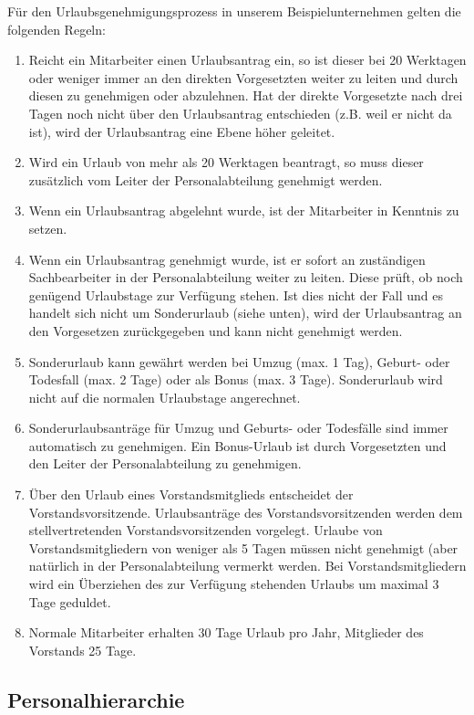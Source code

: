 Für den Urlaubsgenehmigungsprozess in unserem Beispielunternehmen gelten die folgenden Regeln:
\begin{enumerate}
	\item Reicht ein Mitarbeiter einen Urlaubsantrag ein, so ist dieser bei 20 Werktagen oder weniger
	immer an den direkten Vorgesetzten weiter zu leiten und durch diesen zu genehmigen oder
	abzulehnen. Hat der direkte Vorgesetzte nach drei Tagen noch nicht über den Urlaubsantrag
	entschieden (z.B. weil er nicht da ist), wird der Urlaubsantrag eine Ebene höher geleitet.
	\item Wird ein Urlaub von mehr als 20 Werktagen beantragt, so muss dieser zusätzlich vom Leiter der
	Personalabteilung genehmigt werden.
	\item Wenn ein Urlaubsantrag abgelehnt wurde, ist der Mitarbeiter in Kenntnis zu setzen.
	\item Wenn ein Urlaubsantrag genehmigt wurde, ist er sofort an zuständigen Sachbearbeiter in der
	Personalabteilung weiter zu leiten. Diese prüft, ob noch genügend Urlaubstage zur Verfügung
	stehen. Ist dies nicht der Fall und es handelt sich nicht um Sonderurlaub (siehe unten), wird der
	Urlaubsantrag an den Vorgesetzen zurückgegeben und kann nicht genehmigt werden.
	\item Sonderurlaub kann gewährt werden bei Umzug (max. 1 Tag), Geburt- oder Todesfall (max. 2
	Tage) oder als Bonus (max. 3 Tage). Sonderurlaub wird nicht auf die normalen Urlaubstage
	angerechnet.
	\item Sonderurlaubsanträge für Umzug und Geburts- oder Todesfälle sind immer automatisch zu
	genehmigen. Ein Bonus-Urlaub ist durch Vorgesetzten und den Leiter der Personalabteilung zu
	genehmigen.
	\item Über den Urlaub eines Vorstandsmitglieds entscheidet der Vorstandsvorsitzende. Urlaubsanträge
	des Vorstandsvorsitzenden werden dem stellvertretenden Vorstandsvorsitzenden vorgelegt.
	Urlaube von Vorstandsmitgliedern von weniger als 5 Tagen müssen nicht genehmigt (aber
	natürlich in der Personalabteilung vermerkt werden. Bei Vorstandsmitgliedern wird ein
	Überziehen des zur Verfügung stehenden Urlaubs um maximal 3 Tage geduldet.
	\item Normale Mitarbeiter erhalten 30 Tage Urlaub pro Jahr, Mitglieder des Vorstands 25 Tage.
\end{enumerate}

\subsection{Personalhierarchie}
\label{Personalhierarchie}

